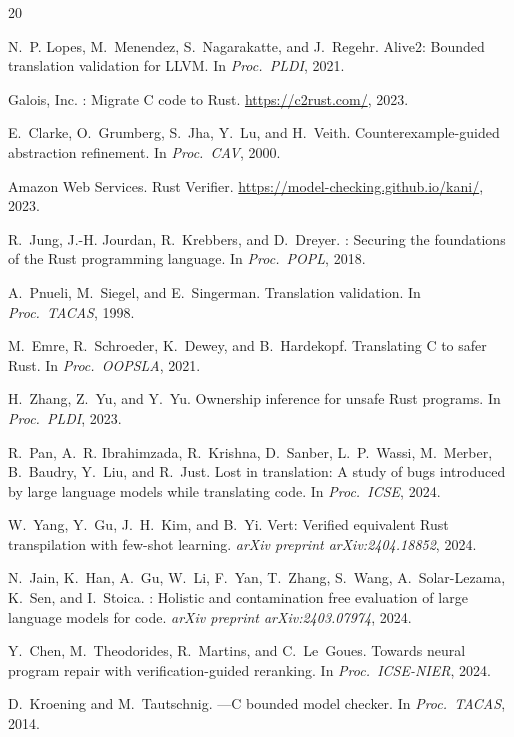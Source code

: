 \documentclass[11pt]{article}
\begin{document}

\begin{thebibliography}{20}

N.~P. Lopes, M.~Menendez, S.~Nagarakatte, and J.~Regehr.
\newblock Alive2: Bounded translation validation for {LLVM}.
\newblock In \emph{Proc.\ PLDI}, 2021.

{Galois, Inc.}
: Migrate {C} code to {Rust}.
\newblock \url{https://c2rust.com/}, 2023.

E.~Clarke, O.~Grumberg, S.~Jha, Y.~Lu, and H.~Veith.
\newblock Counterexample-guided abstraction refinement.
\newblock In \emph{Proc.\ CAV}, 2000.

{Amazon Web Services}.
 {Rust} {Verifier}.
\newblock \url{https://model-checking.github.io/kani/}, 2023.

R.~Jung, J.-H. Jourdan, R.~Krebbers, and D.~Dreyer.
: Securing the foundations of the {Rust} programming
  language.
\newblock In \emph{Proc.\ POPL}, 2018.

A.~Pnueli, M.~Siegel, and E.~Singerman.
\newblock Translation validation.
\newblock In \emph{Proc.\ TACAS}, 1998.

M.~Emre, R.~Schroeder, K.~Dewey, and B.~Hardekopf.
\newblock Translating {C} to safer {Rust}.
\newblock In \emph{Proc.\ OOPSLA}, 2021.

H.~Zhang, Z.~Yu, and Y.~Yu.
\newblock Ownership inference for unsafe {Rust} programs.
\newblock In \emph{Proc.\ PLDI}, 2023.

R.~Pan, A.~R. Ibrahimzada, R.~Krishna, D.~Sanber, L.~P.~Wassi, M.~Merber,
  B.~Baudry, Y.~Liu, and R.~Just.
\newblock Lost in translation: A study of bugs introduced by large language
  models while translating code.
\newblock In \emph{Proc.\ ICSE}, 2024.

W.~Yang, Y.~Gu, J.~H.~Kim, and B.~Yi.
\newblock Vert: Verified equivalent {Rust} transpilation with few-shot
  learning.
\newblock \emph{arXiv preprint arXiv:2404.18852}, 2024.

N.~Jain, K.~Han, A.~Gu, W.~Li, F.~Yan, T.~Zhang, S.~Wang, A.~Solar-Lezama,
  K.~Sen, and I.~Stoica.
: Holistic and contamination free evaluation of large
  language models for code.
\newblock \emph{arXiv preprint arXiv:2403.07974}, 2024.

Y.~Chen, M.~Theodorides, R.~Martins, and C.~Le~Goues.
\newblock Towards neural program repair with verification-guided
  reranking.
\newblock In \emph{Proc.\ ICSE-NIER}, 2024.

D.~Kroening and M.~Tautschnig.
---{C} bounded model checker.
\newblock In \emph{Proc.\ TACAS}, 2014.

\end{thebibliography}
\end{document}
